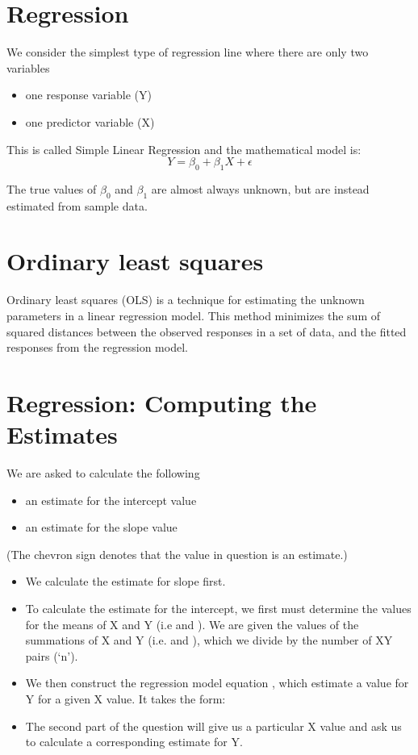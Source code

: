 \documentclass[]{report}
\begin{document}
	


\section{Regression}
We consider the simplest type of regression line where there are only two
variables
\begin{itemize}
	\item  one response variable (Y)
	\item one predictor variable (X)
\end{itemize}
This is called Simple Linear Regression and the mathematical model is:
\[ Y = \beta_0 + \beta_1X + \epsilon \]

The true values of $\beta_0$ and  $\beta_1$ are almost always unknown, but are instead estimated from sample data.



	\section{Ordinary least squares}
	Ordinary least squares (OLS) is a technique for estimating the unknown parameters in a linear regression model. This method minimizes the sum of squared distances between the observed responses in a set of data, and the fitted responses from the regression model.
	


		

	\section{Regression: Computing the Estimates}

	
	We are asked to calculate the following
	\begin{itemize} 
		\item an estimate for the intercept value
		\item an estimate for the slope value
	\end{itemize}
	(The chevron sign denotes that the value in question is an estimate.)
	
	
	\begin{itemize}
		\item 	We calculate the estimate for slope first.
		
		\item To calculate the estimate for the intercept, we first must determine the values for the means of X and Y (i.e  and ). We are given the values of the summations of X and Y (i.e. and ), which we divide by the number of XY pairs (‘n’). 
		
		\item 	We then construct the regression model equation , which estimate a value for Y for a  given X value. It takes the form:	
		
		\item The second part of the question will give us a particular X value and ask us to calculate a corresponding estimate for Y.
		
	\end{itemize}
	
\end{document}
